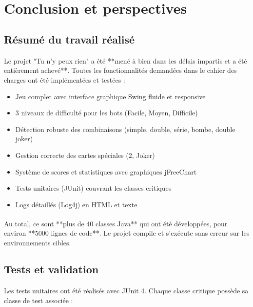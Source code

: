 \newpage
\section{Conclusion et perspectives}
\label{sec:conclusion}

\subsection{Résumé du travail réalisé}
\paragraph{} Le projet "Tu n'y peux rien" a été **mené à bien dans les délais impartis et a été entièrement achevé**. Toutes les fonctionnalités demandées dans le cahier des charges ont été implémentées et testées :

\begin{itemize}
\item Jeu complet avec interface graphique Swing fluide et responsive
\item 3 niveaux de difficulté pour les bots (Facile, Moyen, Difficile)
\item Détection robuste des combinaisons (simple, double, série, bombe, double joker)
\item Gestion correcte des cartes spéciales (2, Joker)
\item Système de scores et statistiques avec graphiques jFreeChart
\item Tests unitaires (JUnit) couvrant les classes critiques
\item Logs détaillés (Log4j) en HTML et texte
\end{itemize}

\paragraph{} Au total, ce sont **plus de 40 classes Java** qui ont été développées, pour environ **5000 lignes de code**. Le projet compile et s'exécute sans erreur sur les environnements cibles.

\subsection{Tests et validation}
\label{sec:tests}

\paragraph{} Les tests unitaires ont été réalisés avec JUnit 4. Chaque classe critique possède sa classe de test associée :

